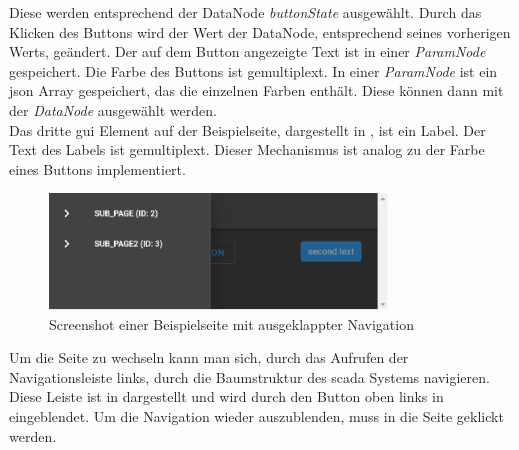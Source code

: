 Diese werden entsprechend der DataNode \emph{buttonState} ausgewählt. 
Durch das Klicken des Buttons wird der Wert der DataNode, entsprechend seines vorherigen Werts, geändert. 
Der auf dem Button angezeigte Text ist in einer \emph{ParamNode} gespeichert. Die Farbe des Buttons ist gemultiplext.
In einer \emph{ParamNode} ist ein \ac{json} Array gespeichert, das die einzelnen Farben enthält.
Diese können dann mit der  \emph{DataNode} ausgewählt werden. 
\\Das dritte \ac{gui} Element auf der Beispielseite, dargestellt in , ist ein Label.
Der Text des Labels ist gemultiplext. Dieser Mechanismus ist analog zu der Farbe eines Buttons implementiert. 

\begin{figure}[ht]
  \centering
  \includegraphics[width=0.8\textwidth]{content/hauptteil/umsetzungPoC/frontend/res/nav.pdf}
  \caption{Screenshot einer Beispielseite mit ausgeklappter Navigation}
  \label{fig:frontend:poc:page:nav}
\end{figure}
Um die Seite zu wechseln kann man sich, durch das Aufrufen der Navigationsleiste links, durch die Baumstruktur des \ac{scada} Systems navigieren.
Diese Leiste ist in  dargestellt und wird durch den Button oben links in  eingeblendet.
Um die Navigation wieder auszublenden, muss in die Seite geklickt werden.
